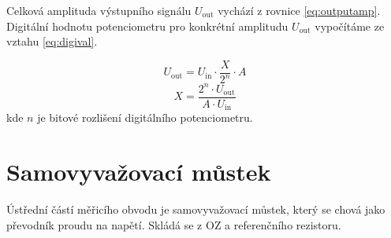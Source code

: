 Celková amplituda výstupního signálu $U_{\text{out}}$ vychází z rovnice \ref{eq:outputamp}.
Digitální hodnotu potenciometru pro konkrétní amplitudu $U_{\text{out}}$ vypočítáme ze vztahu \ref{eq:digival}.

\begin{equation}
    U_{\text{out}} = U_{\text{in}} \cdot \frac{X}{2^n} \cdot A
\label{eq:outputamp}
\end{equation}
\begin{equation}
        X = \frac{2^n\cdot U_{\text{out}}}{A\cdot U_{\text{in}}} 
    \label{eq:digival}
\end{equation}
kde $n$ je bitové rozlišení digitálního potenciometru.



\section{Samovyvažovací můstek}

Ústřední částí měřicího obvodu je samovyvažovací můstek, který se chová jako převodník proudu na napětí. Skládá se z \acs{OZ} a referenčního rezistoru.

